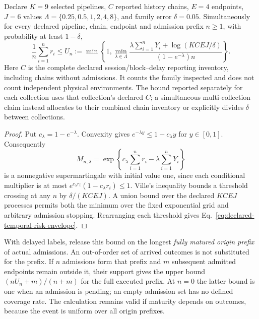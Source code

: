 \begin{proposition}
\label{prop:declared-temporal-risk-envelope}
Declare $K=9$ selected pipelines, $C$ reported history chains, $E=4$
endpoints, $J=6$ values
$\Lambda=\{0.25,0.5,1,2,4,8\}$, and family error $\delta=0.05$.
Simultaneously for every declared pipeline, chain, endpoint and admission
prefix $n\geq1$, with probability at least $1-\delta$,
\begin{equation}
 \frac1n\sum_{i=1}^n r_i\leq
 U_n:=\min\!\left\{1,\min_{\lambda\in\Lambda}
 \frac{\lambda\sum_{i=1}^nY_i+
       \log(KCEJ/\delta)}{(1-e^{-\lambda})n}\right\}.
 \label{eq:declared-temporal-risk-envelope}
\end{equation}
Here $C$ is the complete declared session/block--delay reporting inventory,
including chains without admissions. It counts the family inspected and
does not count independent physical environments. The bound reported
separately for each collection uses that collection's declared $C$;
a simultaneous multi-collection claim instead allocates to their combined
chain inventory or explicitly divides $\delta$ between collections.
\end{proposition}
\begin{proof}
Put $c_\lambda=1-e^{-\lambda}$. Convexity gives
$e^{-\lambda y}\leq1-c_\lambda y$ for $y\in[0,1]$.
Consequently
\begin{equation}
 M_{n,\lambda}=\exp\left\{
 c_\lambda\sum_{i=1}^n r_i-\lambda\sum_{i=1}^nY_i\right\}
 \label{eq:admitted-risk-supermartingale}
\end{equation}
is a nonnegative supermartingale with initial value one, since each
conditional multiplier is at most
$e^{c_\lambda r_i}(1-c_\lambda r_i)\leq1$.
Ville's inequality bounds a threshold crossing at any $n$ by
$\delta/(KCEJ)$. A union bound over the declared $KCEJ$ processes
permits both the minimum over the fixed exponential grid and arbitrary
admission stopping. Rearranging each threshold gives
Eq.~\eqref{eq:declared-temporal-risk-envelope}.
\end{proof}

With delayed labels, release this bound on the longest \emph{fully
matured origin prefix} of actual admissions. An out-of-order set of
arrived outcomes is not substituted for the prefix. If $n$ admissions
form that prefix and $m$ subsequent admitted endpoints remain outside it,
their support gives the upper bound
$(nU_n+m)/(n+m)$ for the full executed prefix. At $n=0$ the latter
bound is one when an admission is pending; an empty admission set has
no defined coverage rate. The calculation remains valid if maturity
depends on outcomes, because the event is uniform over all origin prefixes.

